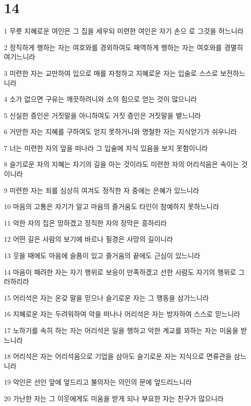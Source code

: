 \chapter{14}

\par 1 무릇 지혜로운 여인은 그 집을 세우되 미련한 여인은 자기 손으 로 그것을 허느니라
\par 2 정직하게 행하는 자는 여호와를 경외하여도 패역하게 행하는 자는 여호와를 경멸히 여기느니라
\par 3 미련한 자는 교만하여 입으로 매를 자청하고 지혜로운 자는 입술로 스스로 보전하느니라
\par 4 소가 없으면 구유는 깨끗하려니와 소의 힘으로 얻는 것이 많으니라
\par 5 신실한 증인은 거짓말을 아니하여도 거짓 증인은 거짓말을 뱉느니라
\par 6 거만한 자는 지혜를 구하여도 얻지 못하거니와 명철한 자는 지식얻기가 쉬우니라
\par 7 너는 미련한 자의 앞을 떠나라 그 입술에 지식 있음을 보지 못함이니라
\par 8 슬기로운 자의 지혜는 자기의 길을 아는 것이라도 미련한 자의 어리석음은 속이는 것이니라
\par 9 미련한 자는 죄를 심상히 여겨도 정직한 자 중에는 은혜가 있느니라
\par 10 마음의 고통은 자기가 알고 마음의 즐거움도 타인이 참예하지 못하느니라
\par 11 악한 자의 집은 망하겠고 정직한 자의 장막은 흥하리라
\par 12 어떤 길은 사람의 보기에 바르나 필경은 사망의 길이니라
\par 13 웃을 때에도 마음에 슬픔이 있고 즐거움의 끝에도 근심이 있느니라
\par 14 마음이 패려한 자는 자기 행위로 보응이 만족하겠고 선한 사람도 자기의 행위로 그러하리라
\par 15 어리석은 자는 온갖 말을 믿으나 슬기로운 자는 그 행동을 삼가느니라
\par 16 지혜로운 자는 두려워하여 악을 떠나나 어리석은 자는 방자하여 스스로 믿느니라
\par 17 노하기를 속히 하는 자는 어리석은 일을 행하고 악한 계교를 꾀하는 자는 미움을 받느니라
\par 18 어리석은 자는 어리석음으로 기업을 삼아도 슬기로운 자는 지식으로 면류관을 삼느니라
\par 19 악인은 선인 앞에 엎드리고 불의자는 의인의 문에 엎드리느니라
\par 20 가난한 자는 그 이웃에게도 미움을 받게 되나 부요한 자는 친구가 많으니라
